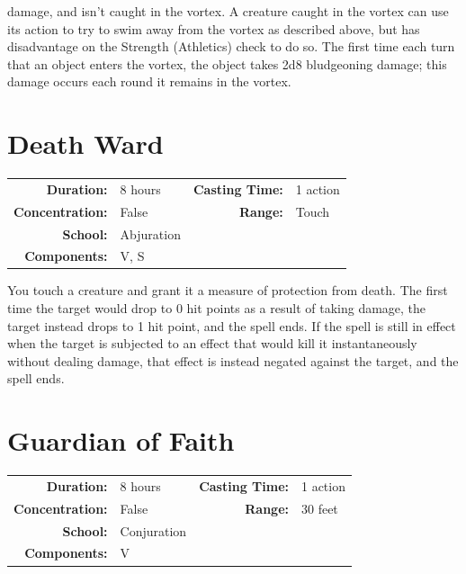 \documentclass[12pt,showtrims]{memoir}
\begin{document}
damage, and isn't caught in the vortex. A creature caught in the vortex can use its action to try to swim away from the vortex as described above, but has disadvantage on the Strength (Athletics) check to do so. The first time each turn that an object enters the vortex, the object takes 2d8 bludgeoning damage; this damage occurs each round it remains in the vortex.

\newpage
\section*{Death Ward}

{
\small\centering\vspace{-6pt}
\begin{tabular}{rlrl}
\toprule

\textbf{Duration:} & 8 hours &
\textbf{Casting Time:} & 1 action \\
\textbf{Concentration:} & False &
\textbf{Range:} & Touch \\
\textbf{School:} & Abjuration \\
\textbf{Components:} & \multicolumn{3}{p{0.7\textwidth}}{V, S}\\

\bottomrule
\end{tabular}
}

\vspace{1\baselineskip}\noindent You touch a creature and grant it a measure of protection from death. The first time the target would drop to 0 hit points as a result of taking damage, the target instead drops to 1 hit point, and the spell ends. If the spell is still in effect when the target is subjected to an effect that would kill it instantaneously without dealing damage, that effect is instead negated against the target, and the spell ends.

\newpage
\section*{Guardian of Faith}

{
\small\centering\vspace{-6pt}
\begin{tabular}{rlrl}
\toprule

\textbf{Duration:} & 8 hours &
\textbf{Casting Time:} & 1 action \\
\textbf{Concentration:} & False &
\textbf{Range:} & 30 feet \\
\textbf{School:} & Conjuration \\
\textbf{Components:} & \multicolumn{3}{p{0.7\textwidth}}{V}\\

\bottomrule
\end{tabular}
}
\end{document}
